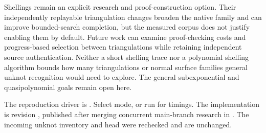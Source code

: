 Shellings remain an explicit research and proof-construction option. Their
independently replayable triangulation changes broaden the native family and
can improve bounded-search completion, but the measured corpus does not
justify enabling them by default. Future work can examine proof-checking
costs and progress-based selection between triangulations while retaining
independent source authentication. Neither a short shelling trace nor a
polynomial shelling algorithm bounds how many triangulations or normal
surface families general unknot recognition would need to explore.
The general subexponential and quasipolynomial goals remain open here.

The reproduction driver is .
Select  mode, or run  for timings. The implementation is
revision , published after merging concurrent main-branch
research in . The incoming unknot inventory and
 head  were rechecked and are unchanged.
